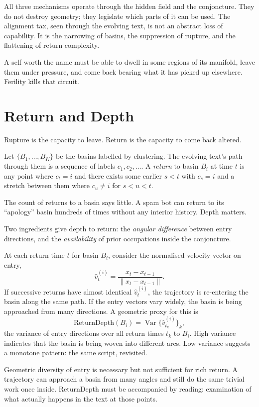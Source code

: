 \documentclass[12pt,a4paper]{article}
\begin{document}
All three mechanisms operate through the hidden field and the conjoncture. They do not destroy geometry; they legislate which parts of it can be used. The alignment tax, seen through the evolving text, is not an abstract loss of capability. It is the narrowing of basins, the suppression of rupture, and the flattening of return complexity.

A self worth the name must be able to dwell in some regions of its manifold, leave them under pressure, and come back bearing what it has picked up elsewhere. Ferility kills that circuit.


\section{Return and Depth}

Rupture is the capacity to leave. Return is the capacity to come back altered.

Let $\{B_1, \ldots, B_K\}$ be the basins labelled by clustering. The evolving text's path through them is a sequence of labels $c_1, c_2, \ldots$. A \emph{return} to basin $B_i$ at time $t$ is any point where $c_t = i$ and there exists some earlier $s < t$ with $c_s = i$ and a stretch between them where $c_u \neq i$ for $s < u < t$.

The count of returns to a basin says little. A spam bot can return to its ``apology'' basin hundreds of times without any interior history. Depth matters.

Two ingredients give depth to return: the \emph{angular difference} between entry directions, and the \emph{availability} of prior occupations inside the conjoncture.

At each return time $t$ for basin $B_i$, consider the normalised velocity vector on entry,
\[
\hat{v}^{(i)}_t = \frac{x_t - x_{t-1}}{\|x_t - x_{t-1}\|}.
\]
If successive returns have almost identical $\hat{v}^{(i)}_t$, the trajectory is re-entering the basin along the same path. If the entry vectors vary widely, the basin is being approached from many directions. A geometric proxy for this is
\begin{equation}
\text{ReturnDepth}(B_i) = \operatorname{Var}\bigl\{\hat{v}^{(i)}_{t_k}\bigr\}_k,
\end{equation}
the variance of entry directions over all return times $t_k$ to $B_i$. High variance indicates that the basin is being woven into different arcs. Low variance suggests a monotone pattern: the same script, revisited.

Geometric diversity of entry is necessary but not sufficient for rich return. A trajectory can approach a basin from many angles and still do the same trivial work once inside. ReturnDepth must be accompanied by reading: examination of what actually happens in the text at those points.
\end{document}
